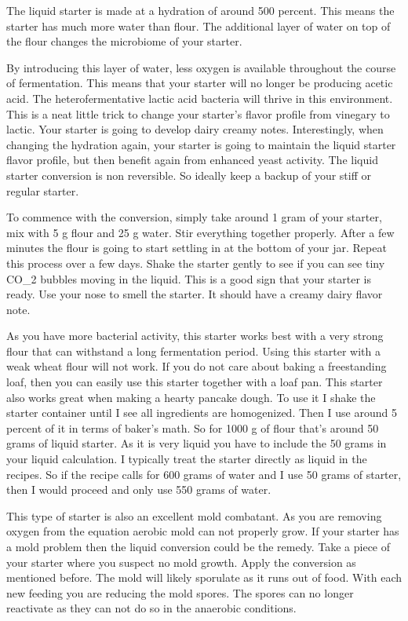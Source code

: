 The liquid starter is made at a hydration of around 500 percent. This means
the starter has much more water than flour. The additional layer of water on
top of the flour changes the microbiome of your starter.

By introducing this layer of water, less oxygen is available throughout the
course of fermentation. This means that your starter will no longer be
producing acetic acid. The heterofermentative lactic acid bacteria will thrive
in this environment. This is a neat little trick to change your starter's
flavor profile from vinegary to lactic. Your starter is going to develop
dairy creamy notes. Interestingly, when changing the hydration again, your starter
is going to maintain the liquid starter flavor profile, but then benefit again
from enhanced yeast activity. The liquid starter conversion is non reversible.
So ideally keep a backup of your stiff or regular starter.

To commence with the
conversion, simply take around 1 gram of your starter, mix with 5 g flour and
25 g water. Stir everything together properly. After a few minutes the flour is
going to start settling in at the bottom of your jar. Repeat this process over
a few days. Shake the starter gently to see if you can see tiny CO_{2} bubbles
moving in the liquid. This is a good sign that your starter is ready. Use your
nose to smell the starter. It should have a creamy dairy flavor note.

As you have more bacterial activity, this starter works best with a very strong
flour that can withstand a long fermentation period. Using this starter with a
weak wheat flour will not work. If you do not care about baking a freestanding loaf,
then you can easily use this starter together with a loaf pan.
This starter also works great when making a hearty pancake dough. To use it I
shake the starter container until I see all ingredients are homogenized. Then
I use around 5 percent of it in terms of baker's math. So for 1000 g of flour
that's around 50 grams of liquid starter. As it is very liquid you have to
include the 50 grams in your liquid calculation. I typically treat the starter
directly as liquid in the recipes. So if the recipe calls for 600 grams of water
and I use 50 grams of starter, then I would proceed and only use 550 grams of
water.

This type of starter is also an excellent mold combatant. As you are removing
oxygen from the equation aerobic mold can not properly grow. If your starter
has a mold problem then the liquid conversion could be the remedy. Take a
piece of your starter where you suspect no mold growth. Apply the conversion
as mentioned before. The mold will likely sporulate as it runs out of food.
With each new feeding you are reducing the mold spores. The spores can no
longer reactivate as they can not do so in the anaerobic conditions.

